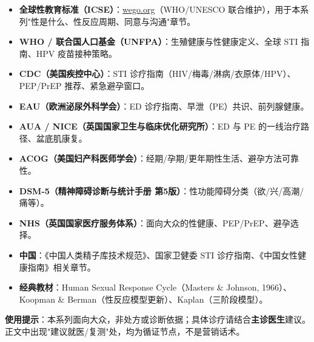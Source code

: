 \begin{itemize}
  \item \textbf{全球性教育标准（ICSE）}：\href{https://www.wego.org}{wego.org}（WHO/UNESCO 联合维护），用于本系列"性是什么、性反应周期、同意与沟通"章节。
  \item \textbf{WHO / 联合国人口基金（UNFPA）}：生殖健康与性健康定义、全球 STI 指南、HPV 疫苗接种策略。
  \item \textbf{CDC（美国疾控中心）}：STI 诊疗指南（HIV/梅毒/淋病/衣原体/HPV）、PEP/PrEP 推荐、紧急避孕窗口。
  \item \textbf{EAU（欧洲泌尿外科学会）}：ED 诊疗指南、早泄（PE）共识、前列腺健康。
  \item \textbf{AUA / NICE（英国国家卫生与临床优化研究所）}：ED 与 PE 的一线治疗路径、盆底肌康复。
  \item \textbf{ACOG（美国妇产科医师学会）}：经期/孕期/更年期性生活、避孕方法可靠性。
  \item \textbf{DSM-5（精神障碍诊断与统计手册 第5版）}：性功能障碍分类（欲/兴/高潮/痛等）。
  \item \textbf{NHS（英国国家医疗服务体系）}：面向大众的性健康、PEP/PrEP、避孕选择。
  \item \textbf{中国}：《中国人类精子库技术规范》、国家卫健委 STI 诊疗指南、《中国女性健康指南》相关章节。
  \item \textbf{经典教材}：Human Sexual Response Cycle（Masters \& Johnson, 1966）、Koopman \& Berman（性反应模型更新）、Kaplan（三阶段模型）。
\end{itemize}

\textbf{使用提示}：本系列面向大众，非处方或诊断依据；具体诊疗请结合\textbf{主诊医生}建议。正文中出现"建议就医/复测"处，均为循证节点，不是营销话术。


